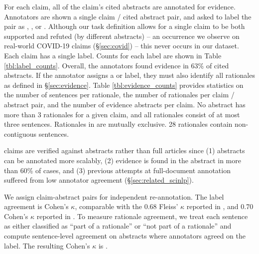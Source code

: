  For each claim, all of the claim's cited abstracts are annotated for evidence. Annotators are shown a single claim / cited abstract pair, and asked to label the pair as \supports, , or \notenough. Although our task definition allows for a single claim to be both supported and refuted (by different abstracts) -- an occurrence we observe on real-world COVID-19 claims (\S\ref{sec:covid}) -- this never occurs in our dataset. Each claim has a single label. Counts for each label are shown in Table \ref{tbl:label_counts}. Overall, the annotators found evidence in 63\% of cited abstracts.  If the annotator assigns a \supports or  label, they must also identify all rationales as defined in \S\ref{sec:evidence}. Table \ref{tbl:evidence_counts} provides statistics on the number of sentences per rationale, the number of rationales per claim / abstract pair, and the number of evidence abstracts per claim.  No abstract has more than 3 rationales for a given claim, and all rationales consist of at most three sentences. Rationales in \ours are mutually exclusive. 28 rationales contain non-contiguous sentences.

\ours claims are verified against abstracts rather than full articles since (1) abstracts can be annotated more scalably, (2) evidence is found in the abstract in more than 60\% of cases, and (3) previous attempts at full-document annotation suffered from low annotator agreement (\S\ref{sec:related_scinlp}).



\vspace{.2cm} 
We assign \nagreement claim-abstract pairs for independent re-annotation. The label agreement is  Cohen's $\kappa$, comparable with the 0.68 Fleiss' $\kappa$ reported in \citet{Thorne2018FEVERAL}, and 0.70 Cohen's $\kappa$ reported in \citet{Hanselowski2019ARA}. To measure rationale agreement, we treat each sentence as either classified as ``part of a rationale'' or ``not part of a rationale'' and compute sentence-level agreement on abstracts where annotators agreed on the \entailment label. The resulting Cohen's $\kappa$ is \rationalekappaagree.
